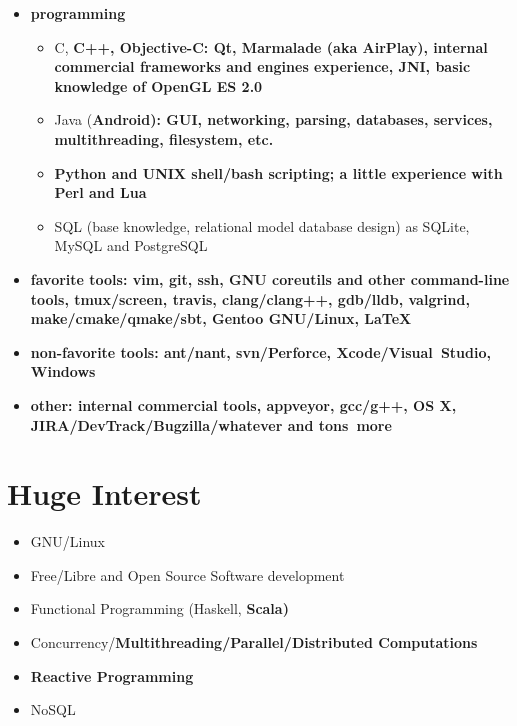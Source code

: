 \begin{itemize}

\item \bfseries programming\mdseries

    \begin{itemize}
    \item C, \bfseries C++\mdseries, Objective-C:
    Qt, Marmalade (aka AirPlay), internal commercial frameworks and engines experience,
    \bfseries JNI\mdseries, basic knowledge of OpenGL ES 2.0


    \item Java (\bfseries Android\mdseries):
    GUI, networking, parsing, databases, services, multithreading, filesystem, etc.


    \item \bfseries Python \mdseries and UNIX \bfseries shell/bash \mdseries scripting;
    a little experience with Perl and Lua

    \item SQL (base knowledge, relational model database design) as SQLite, MySQL and PostgreSQL
    \end{itemize}

\item \bfseries favorite tools\mdseries:
vim, \bfseries git\mdseries, \bfseries ssh\mdseries, GNU \bfseries coreutils \mdseries and other command-line tools, tmux/screen, travis,
clang/clang++, gdb/lldb, valgrind, make/cmake/qmake/sbt, \bfseries Gentoo GNU/Linux\mdseries, \LaTeX
\item \bfseries non-favorite tools\mdseries: ant/nant, svn/Perforce, Xcode/Visual~Studio, Windows
\item \bfseries other\mdseries: internal commercial tools, appveyor, gcc/g++, OS X, JIRA/DevTrack/Bugzilla/whatever and \bfseries tons~\mdseries more

\end{itemize}

\section{Huge Interest}
\begin{itemize}
\item GNU/Linux
\item Free/Libre and Open Source Software development
\item Functional Programming (Haskell, \bfseries Scala\mdseries)
\item Concurrency/\bfseries Multithreading\mdseries/Parallel/\bfseries Distributed \mdseries Computations
\item \bfseries Reactive \mdseries Programming
\item NoSQL
\end{itemize}

